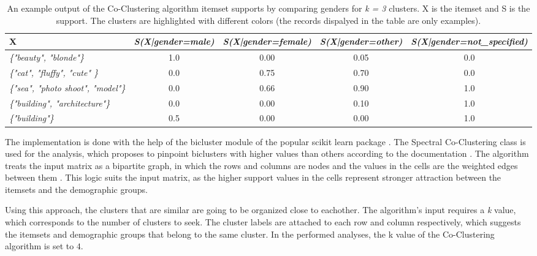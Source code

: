     \begin{table}[H]
        \centering
        \begin{adjustbox}{width=1\textwidth}
            \begin{tabular}{l|c|c|c|c}
                X & \emph{S(X|gender=male)} & \emph{S(X|gender=female)} & \emph{S(X|gender=other)} & \emph{S(X|gender=not\_specified)} \\
                \hline
                \emph{\{"beauty", "blonde"\}} & \cellcolor{blue!25}1.0 &  0.00 &  0.05 &  0.0 \\
                \emph{\{"cat", "fluffy", "cute" \}} &  0.0 & \cellcolor{red!25}0.75 & \cellcolor{red!25}0.70 &  0.0 \\
                \emph{\{"sea", "photo shoot", "model"\}} &  0.0 & \cellcolor{red!25}0.66 & \cellcolor{red!25}0.90 & \cellcolor{green!25}1.0 \\
                \emph{\{"building", "architecture"\}} &  0.0 &  0.00 &  0.10 & \cellcolor{green!25}1.0 \\
                \emph{\{"building"\}} &  0.5 &  0.00 &  0.00 & \cellcolor{green!25}1.0
            \end{tabular}
        \end{adjustbox}
        \caption{An example output of the Co-Clustering algorithm itemset supports by comparing genders for \emph{k = 3} clusters. X is the itemset and S is the support. The clusters are highlighted with different colors (the records dispalyed in the table are only examples).}
        \label{coclustering_output_format}
    \end{table}
    
    The implementation is done with the help of the bicluster module \cite{scikit-bicluster} of the popular scikit learn package \cite{scikit-learn}. The Spectral Co-Clustering class is used for the analysis, which proposes to pinpoint biclusters with higher values than others according to the documentation \cite{scikit-bicluster}. The algorithm treats the input matrix as a bipartite graph, in which the rows and columns are nodes and the values in the cells are the weighted edges between them \cite{scikit-bicluster}. This logic suits the input matrix, as the higher support values in the cells represent stronger attraction between the itemsets and the demographic groups.

    Using this approach, the clusters that are similar are going to be organized close to eachother. The algorithm's input requires a \emph{k} value, which corresponds to the number of clusters to seek. The cluster labels are attached to each row and column respectively, which suggests the itemsets and demographic groups that belong to the same cluster. In the performed analyses, the k value of the Co-Clustering algorithm is set to $4$. 

